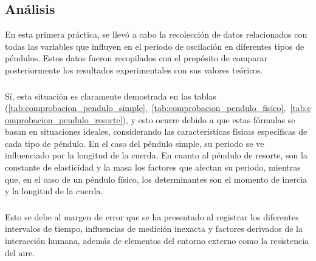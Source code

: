 \documentclass[twocolumn, 12pt]{article}
\begin{document}
\subsection{Análisis}

En esta primera práctica, se llevó a cabo la recolección de
datos relacionados con todas las variables que influyen en
el periodo de oscilación en diferentes tipos de péndulos.
Estos datos fueron recopilados con el propósito de comparar
posteriormente los resultados experimentales con sus
valores teóricos.

\subsubsection{}

Sí, esta situación es claramente demostrada en las tablas
(\ref{tab:comprobacion_pendulo_simple},~\ref{tab:comprobacion_pendulo_fisico},~\ref{tab:comprobacion_pendulo_resorte}),
y esto ocurre debido a que estas fórmulas se basan en
situaciones ideales, considerando las características
físicas específicas de cada tipo de péndulo. En el caso del
péndulo simple, su periodo se ve influenciado por la
longitud de la cuerda. En cuanto al péndulo de resorte, son
la constante de elasticidad y la masa los factores que
afectan su periodo, mientras que, en el caso de un péndulo
físico, los determinantes son el momento de inercia y la
longitud de la cuerda.

\subsubsection{}

Esto se debe al margen de error que se ha presentado al
registrar los diferentes intervalos de tiempo, influencias
de medición inexacta y factores derivados de la interacción
humana, además de elementos del entorno externo como la
resistencia del aire.

\subsubsection{}
\end{document}
